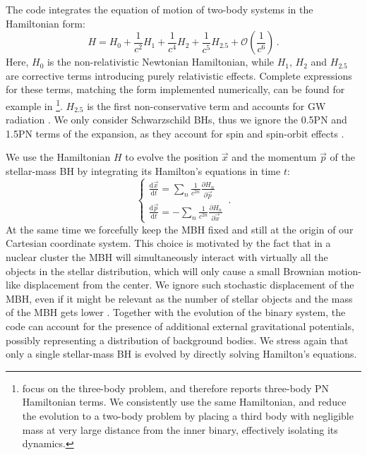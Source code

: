 \documentclass[desactivate]{aa}
\begin{document}
        The code integrates the equation of motion of two-body systems in the Hamiltonian form:
        \begin{equation} \label{eq:hamiltonian}
            H = H_0 + \frac{1}{c^2} H_1 + \frac{1}{c^4} H_2 + \frac{1}{c^5} H_{2.5} + \mathcal{O} \left( \frac{1}{c^6} \right) \, .
        \end{equation}
        Here, $H_0$ is the non-relativistic Newtonian Hamiltonian, while $H_1$, $H_2$ and $H_{2.5}$ are corrective terms introducing purely relativistic effects. Complete expressions for these terms, matching the form implemented numerically, can be found for example in \citet{2016MNRAS.461.4419B}\footnote{\citet{2016MNRAS.461.4419B} focus on the three-body problem, and therefore reports three-body PN Hamiltonian terms. We consistently use the same Hamiltonian, and reduce the evolution to a two-body problem by placing a third body with negligible mass at very large distance from the inner binary, effectively isolating its dynamics.}.
        $H_{2.5}$ is the first non-conservative term and accounts for GW radiation \citep{1997PhRvD..55.4712J,2014LRR....17....2B}. We only consider Schwarzschild BHs, thus we ignore the 0.5PN and 1.5PN terms of the expansion, as they account for spin and spin-orbit effects \citep{2024LRR....27....2S}.
        
        We use the Hamiltonian $H$ to evolve the position $\vec{x}$ and the momentum $\vec{p}$ of the stellar-mass BH by integrating its Hamilton's equations in time $t$:
        \begin{equation}
            \begin{cases}
                    \displaystyle \frac{\mathrm{d} \vec{x}}{\mathrm{d} t} = \sum_n \frac{1}{c^{2n}} \frac{\partial H_n}{\partial \vec{p}} \\
                    \displaystyle \frac{\mathrm{d} \vec{p}}{\mathrm{d} t} = - \sum_n \frac{1}{c^{2n}} \frac{\partial H_n}{\partial \vec{x}} 
            \end{cases} \, .
        \end{equation}
        At the same time we forcefully keep the MBH fixed and still at the origin of our Cartesian coordinate system. This choice is motivated by the fact that in a nuclear cluster the MBH will simultaneously interact with virtually all the objects in the stellar distribution, which will only cause a small Brownian motion-like displacement from the center.
        We ignore such stochastic displacement of the MBH, even if it might be relevant as the number of stellar objects and the mass of the MBH gets lower \citep{2013degn.book.....M}.
        Together with the evolution of the binary system, the code can account for the presence of additional external gravitational potentials, possibly representing a distribution of background bodies. We stress again that only a single stellar-mass BH is evolved by directly solving Hamilton's equations.
\end{document}
